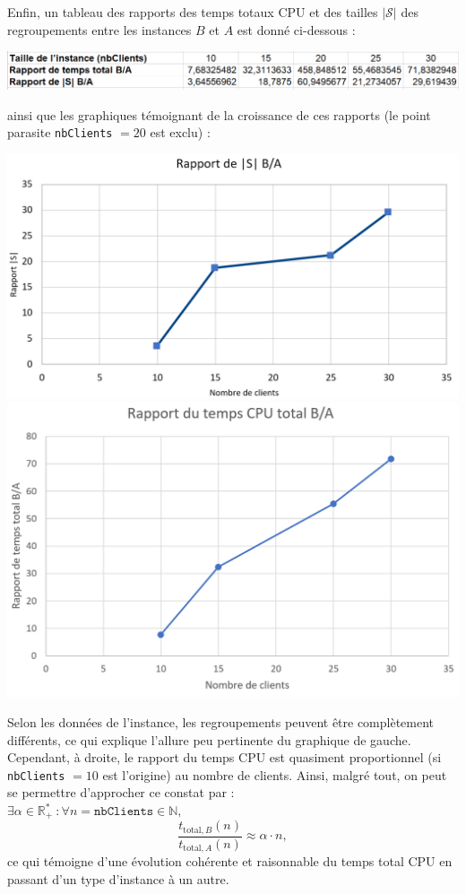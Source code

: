 \documentclass[french, 11pt, a4paper]{article} %
\newcommand{\Sc}{\mathcal{S}} %
\newcommand{\N}{\mathbb{N}}
\newcommand{\R}{\mathbb{R}^*_+}
\newcommand{\smb}{\smallbreak}
\begin{document}
\smb Enfin, un tableau des rapports des temps totaux CPU et des tailles $|\Sc|$ des regroupements entre les instances $B$ et $A$
est donné ci-dessous :

\begin{center}
    \includegraphics[scale=0.60]{Ratios.PNG}
\end{center}

ainsi que les graphiques témoignant de la croissance de ces rapports (le point parasite \verb+nbClients+ $=20$ est exclu) :
\begin{center}
    \includegraphics[scale=0.340]{GraphRatioSCallig.PNG}    
    \includegraphics[scale=0.340]{GraphRatioTps.PNG}
\end{center}

Selon les données de l'instance, les regroupements peuvent être complètement différents, ce qui explique
l'allure peu pertinente du graphique de gauche.
\smb Cependant, à droite, le rapport du temps CPU est quasiment proportionnel (si \verb+nbClients+ $=10$ est l'origine)
au nombre de clients. Ainsi, malgré tout, on peut se permettre d'approcher ce constat par : \\ $\exists \alpha \in \R \: : \forall n = \texttt{nbClients} \in \N,$
\[ \dfrac{t_{\text{total},B}(n)}{t_{\text{total},A}(n)} \approx \alpha \cdot n , \]
ce qui témoigne d'une évolution cohérente et raisonnable du temps total CPU en passant d'un type d'instance à un autre.
\end{document}
